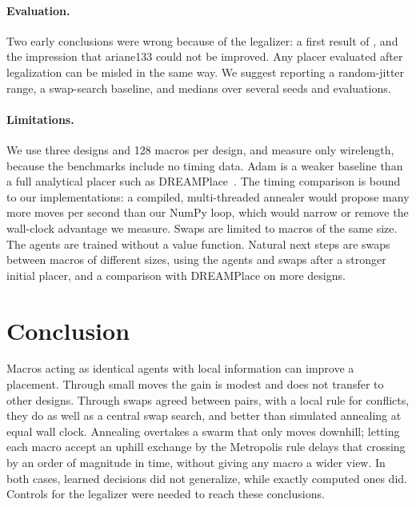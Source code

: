 \documentclass[10pt]{article}
\begin{document}
\paragraph{Evaluation.} Two early conclusions were wrong because of the legalizer: a first result of \nFirstRunBest{}, and the impression that ariane133 could not be improved. Any placer evaluated after legalization can be misled in the same way. We suggest reporting a random-jitter range, a swap-search baseline, and medians over several seeds and evaluations.

\paragraph{Limitations.} We use three designs and 128 macros per design, and measure only wirelength, because the benchmarks include no timing data. Adam is a weaker baseline than a full analytical placer such as DREAMPlace~\citep{lin2019dreamplace}. The timing comparison is bound to our implementations: a compiled, multi-threaded annealer would propose many more moves per second than our NumPy loop, which would narrow or remove the wall-clock advantage we measure. Swaps are limited to macros of the same size. The agents are trained without a value function. Natural next steps are swaps between macros of different sizes, using the agents and swaps after a stronger initial placer, and a comparison with DREAMPlace on more designs.

\section{Conclusion}
Macros acting as identical agents with local information can improve a placement. Through small moves the gain is modest and does not transfer to other designs. Through swaps agreed between pairs, with a local rule for conflicts, they do as well as a central swap search, and better than simulated annealing at equal wall clock. Annealing overtakes a swarm that only moves downhill; letting each macro accept an uphill exchange by the Metropolis rule delays that crossing by an order of magnitude in time, without giving any macro a wider view. In both cases, learned decisions did not generalize, while exactly computed ones did. Controls for the legalizer were needed to reach these conclusions.

\small


\normalsize
\end{document}
